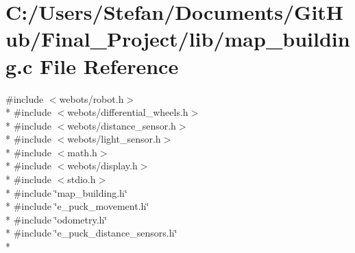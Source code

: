 \section{C\-:/\-Users/\-Stefan/\-Documents/\-Git\-Hub/\-Final\-\_\-\-Project/lib/map\-\_\-building.c File Reference}
\label{lib_2map__building_8c}
{\ttfamily \#include $<$webots/robot.\-h$>$}\\*
{\ttfamily \#include $<$webots/differential\-\_\-wheels.\-h$>$}\\*
{\ttfamily \#include $<$webots/distance\-\_\-sensor.\-h$>$}\\*
{\ttfamily \#include $<$webots/light\-\_\-sensor.\-h$>$}\\*
{\ttfamily \#include $<$math.\-h$>$}\\*
{\ttfamily \#include $<$webots/display.\-h$>$}\\*
{\ttfamily \#include $<$stdio.\-h$>$}\\*
{\ttfamily \#include \char`\"{}map\-\_\-building.\-h\char`\"{}}\\*
{\ttfamily \#include \char`\"{}e\-\_\-puck\-\_\-movement.\-h\char`\"{}}\\*
{\ttfamily \#include \char`\"{}odometry.\-h\char`\"{}}\\*
{\ttfamily \#include \char`\"{}e\-\_\-puck\-\_\-distance\-\_\-sensors.\-h\char`\"{}}\\*
